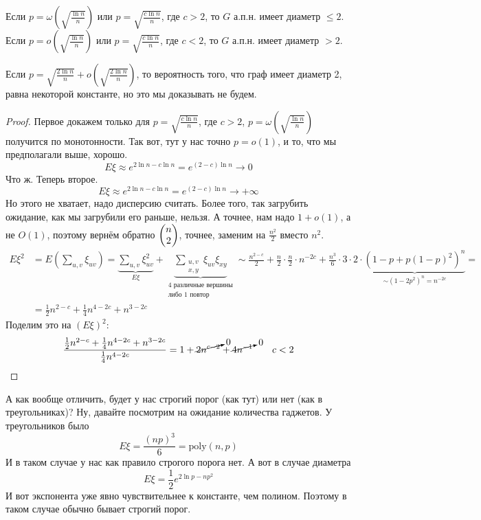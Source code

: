 \documentclass{article}
\begin{document}
    \begin{theorem}
        Если $p=\omega\left(\sqrt{\frac{\ln n}n}\right)$ или $p=\sqrt{\frac{c\ln n}n}$, где $c>2$, то $G$ а.п.н. имеет диаметр $\leqslant2$.\\
        Если $p=o\left(\sqrt{\frac{\ln n}n}\right)$ или $p=\sqrt{\frac{c\ln n}n}$, где $c<2$, то $G$ а.п.н. имеет диаметр $>2$.
    \end{theorem}
    \begin{remark}
        Если $p=\sqrt{\frac{2\ln n}n}+o\left(\sqrt{\frac{2\ln n}n}\right)$, то вероятность того, что граф имеет диаметр 2, равна некоторой константе, но это мы доказывать не будем.
    \end{remark}
    \begin{proof}
        Первое докажем только для $p=\sqrt{\frac{c\ln n}n}$, где $c>2$, $p=\omega\left(\sqrt{\frac{\ln n}n}\right)$ получится по монотонности. Так вот, тут у нас точно $p=o(1)$, и то, что мы предполагали выше, хорошо.
        $$
        E\xi\approx e^{2\ln n-c\ln n}=e^{(2-c)\ln n}\rightarrow0
        $$
        Что ж. Теперь второе.
        $$
        E\xi\approx e^{2\ln n-c\ln n}=e^{(2-c)\ln n}\rightarrow+\infty
        $$
        Но этого не хватает, надо дисперсию считать. Более того, так загрубить ожидание, как мы загрубили его раньше, нельзя. А точнее, нам надо $1+o(1)$, а не $O(1)$, поэтому вернём обратно $\left(\begin{matrix}n\\2\end{matrix}\right)$, точнее, заменим на $\frac{n^2}2$ вместо $n^2$.
        \[\begin{split}
            E\xi^2&=E\left(\sum\limits_{u,v}\xi_{uv}\right)=\underbrace{\sum\limits_{u,v}\xi_{uv}^2}_{E\xi}+\underbrace{\sum\limits_{\substack{u,v\\x,y}}\xi_{uv}\xi_{xy}}_{\substack{4\text{ различные вершины}\\\text{либо }1\text{ повтор}}}\sim\frac{n^{2-c}}2+\frac n2\cdot\frac n2\cdot n^{-2c}+\frac{n^3}6\cdot3\cdot2\cdot\underbrace{\left(1-p+p(1-p)^2\right)^n}_{\sim\left(1-2p^2\right)^n=n^{-2c}}=\\&=\frac12n^{2-c}+\frac14n^{4-2c}+n^{3-2c}
        \end{split}\]
        Поделим это на $(E\xi)^2$:
        $$
        \frac{\frac12n^{2-c}+\frac14n^{4-2c}+n^{3-2c}}{\frac14n^{4-2c}}=1+\cancelto0{2n^{c-2}}+\cancelto0{4n^{-1}}\qquad c<2
        $$
    \end{proof}
    \begin{remark}
        А как вообще отличить, будет у нас строгий порог (как тут) или нет (как в треугольниках)? Ну, давайте посмотрим на ожидание количества гаджетов. У треугольников было
        $$
        E\xi=\frac{(np)^3}6=\mathrm{poly}(n,p)
        $$
        И в таком случае у нас как правило строгого порога нет. А вот в случае диаметра
        $$
        E\xi=\frac12e^{2\ln p-np^2}
        $$
        И вот экспонента уже явно чувствительнее к константе, чем полином. Поэтому в таком случае обычно бывает строгий порог.
    \end{remark}
\end{document}
